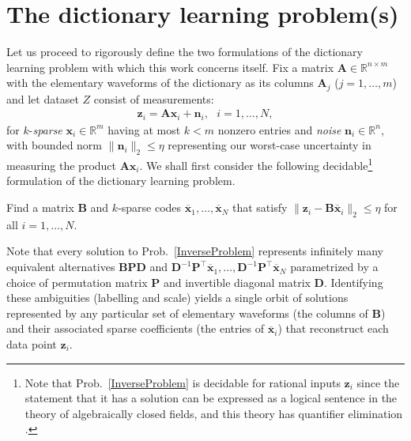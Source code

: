 \section{The dictionary learning problem(s)}

Let us proceed to rigorously define the two formulations of the dictionary learning problem with which this work concerns itself. Fix a matrix $\mathbf{A} \in \mathbb R^{n \times m}$ with the elementary waveforms of the dictionary as its columns  $\mathbf{A}_j$ ($j = 1,\ldots,m$) and let dataset $Z$ consist of measurements:
\begin{align}\label{LinearModel}
\mathbf{z}_i = \mathbf{A}\mathbf{x}_i + \mathbf{n}_i,\ \ \  \text{$i=1,\ldots,N$},
\end{align}
for $k$-\emph{sparse} $\mathbf{x}_i \in \mathbb{R}^m$ having at most $k<m$ nonzero entries and \emph{noise} $\mathbf{n}_i \in \mathbb{R}^n$, with bounded norm $\| \mathbf{n}_i \|_2 \leq  \eta$ representing our worst-case uncertainty in measuring the product $\mathbf{A}\mathbf{x}_i$. We shall first consider the following decidable\footnote{Note that Prob.~\ref{InverseProblem} is decidable for rational inputs $\mathbf{z}_i$ \cite{chrishillar} since the statement that it has a solution can be expressed as a logical sentence in the theory of algebraically closed fields, and this theory has quantifier elimination \cite{basu2006algorithms}.} formulation of the dictionary learning problem.

\begin{problem}\label{InverseProblem}
Find a matrix $\mathbf{B}$ and $k$-sparse codes $\mathbf{\overline x}_1, \ldots, \mathbf{\overline x}_N$ that satisfy $\|\mathbf{z}_i - \mathbf{B}\mathbf{\overline x}_i\|_2 \leq \eta$ for all $i = 1,\ldots,N$.
\end{problem}

Note that every solution to Prob.~\ref{InverseProblem} represents infinitely many equivalent alternatives $\mathbf{BPD}$ and $\mathbf{D}^{-1}\mathbf{P}^{\top}\mathbf{\overline x}_1, \ldots, \mathbf{D}^{-1}\mathbf{P}^{\top}\mathbf{\overline x}_N$ parametrized by a choice of permutation matrix $\mathbf{P}$ and invertible diagonal matrix $\mathbf{D}$. 
Identifying these ambiguities (labelling and scale) yields a single orbit of solutions represented by any particular set of elementary waveforms (the columns of $\mathbf{B}$) and their associated sparse coefficients (the entries of $\mathbf{\overline x}_i$) that reconstruct each data point $\mathbf{z}_i$. 

